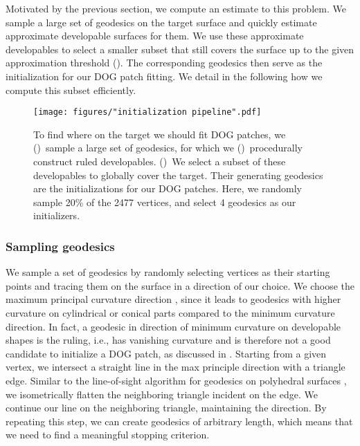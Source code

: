 Motivated by the previous section, we compute an estimate to this problem. We sample a large set of geodesics on the target surface and quickly  estimate approximate developable surfaces for them. We use these approximate developables to select a smaller subset that still covers the surface up to the given approximation threshold (). The corresponding geodesics then serve as the initialization for our DOG  patch fitting. We detail in the following how we compute this subset efficiently.

\begin{figure} [h!]
\centering
\noindent\texttt{[image: figures/"initialization pipeline".pdf]}
\caption{
	To find where on the target we should fit DOG patches, we ()~sample a large set of geodesics, for which we ()~procedurally construct ruled developables. ()~We select a subset of these developables to globally cover the target. Their generating geodesics are the initializations for our DOG patches.
	Here, we randomly sample 20\% of the 2477 vertices, and select 4 geodesics as our initializers. 
	\label{fig:multi_patch_geodesic_initialization}}
\end{figure}


\subsubsection{Sampling geodesics}

We sample a set of geodesics by randomly selecting vertices as their starting points and tracing them on the surface in a direction of our choice. We choose the maximum principal curvature direction \cite{Panozzo:PrincipalCurvature:2010}, since it leads to geodesics with higher curvature on cylindrical or conical parts compared to the minimum curvature direction. In fact, a geodesic in direction of minimum curvature on developable shapes is the ruling, i.e., has vanishing curvature and is therefore not a good candidate to initialize a DOG patch, as discussed in . 
Starting from a given vertex, we intersect a straight line in the max principle direction with a triangle edge. Similar to the line-of-sight algorithm for geodesics on polyhedral surfaces \cite{Balasubramanian:Geodesics:2009,polthier2006straightest}, we isometrically flatten the neighboring triangle incident on the edge. We continue our line on the neighboring triangle, maintaining the direction. 
By repeating this step, we can create geodesics of arbitrary length, which means that we need to find a meaningful stopping criterion.  

